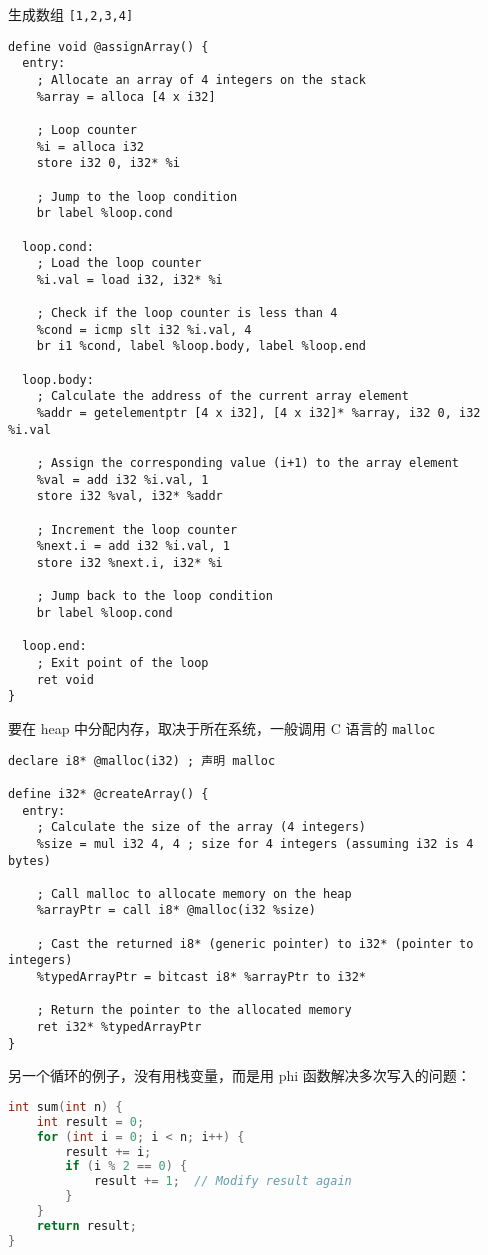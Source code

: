 生成数组 \verb`[1,2,3,4]`
\begin{lstlisting}[language=none]
define void @assignArray() {
  entry:
    ; Allocate an array of 4 integers on the stack
    %array = alloca [4 x i32]

    ; Loop counter
    %i = alloca i32
    store i32 0, i32* %i

    ; Jump to the loop condition
    br label %loop.cond

  loop.cond:
    ; Load the loop counter
    %i.val = load i32, i32* %i

    ; Check if the loop counter is less than 4
    %cond = icmp slt i32 %i.val, 4
    br i1 %cond, label %loop.body, label %loop.end

  loop.body:
    ; Calculate the address of the current array element
    %addr = getelementptr [4 x i32], [4 x i32]* %array, i32 0, i32 %i.val

    ; Assign the corresponding value (i+1) to the array element
    %val = add i32 %i.val, 1
    store i32 %val, i32* %addr

    ; Increment the loop counter
    %next.i = add i32 %i.val, 1
    store i32 %next.i, i32* %i

    ; Jump back to the loop condition
    br label %loop.cond

  loop.end:
    ; Exit point of the loop
    ret void
}
\end{lstlisting}

要在 heap 中分配内存，取决于所在系统，一般调用 C 语言的 \verb`malloc`
\begin{lstlisting}[language=none]
declare i8* @malloc(i32) ; 声明 malloc

define i32* @createArray() {
  entry:
    ; Calculate the size of the array (4 integers)
    %size = mul i32 4, 4 ; size for 4 integers (assuming i32 is 4 bytes)

    ; Call malloc to allocate memory on the heap
    %arrayPtr = call i8* @malloc(i32 %size)

    ; Cast the returned i8* (generic pointer) to i32* (pointer to integers)
    %typedArrayPtr = bitcast i8* %arrayPtr to i32*

    ; Return the pointer to the allocated memory
    ret i32* %typedArrayPtr
}
\end{lstlisting}


另一个循环的例子，没有用栈变量，而是用 phi 函数解决多次写入的问题：
\begin{lstlisting}[language=cpp]
int sum(int n) {
    int result = 0;
    for (int i = 0; i < n; i++) {
        result += i;
        if (i % 2 == 0) {
            result += 1;  // Modify result again
        }
    }
    return result;
}
\end{lstlisting}

